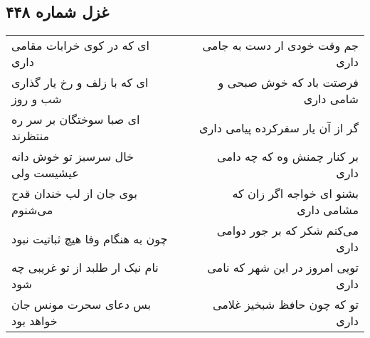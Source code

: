 \begin{center}
\section*{غزل شماره ۴۴۸}
\label{sec:sh448}
\begin{longtable}{l p{0.5cm} r}
ای که در کوی خرابات مقامی داری
&&
جم وقت خودی ار دست به جامی داری
\\
ای که با زلف و رخ یار گذاری شب و روز
&&
فرصتت باد که خوش صبحی و شامی داری
\\
ای صبا سوختگان بر سر ره منتظرند
&&
گر از آن یار سفرکرده پیامی داری
\\
خال سرسبز تو خوش دانه عیشیست ولی
&&
بر کنار چمنش وه که چه دامی داری
\\
بوی جان از لب خندان قدح می‌شنوم
&&
بشنو ای خواجه اگر زان که مشامی داری
\\
چون به هنگام وفا هیچ ثباتیت نبود
&&
می‌کنم شکر که بر جور دوامی داری
\\
نام نیک ار طلبد از تو غریبی چه شود
&&
تویی امروز در این شهر که نامی داری
\\
بس دعای سحرت مونس جان خواهد بود
&&
تو که چون حافظ شبخیز غلامی داری
\\
\end{longtable}
\end{center}
